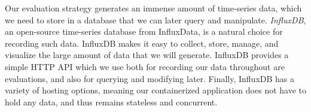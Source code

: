 Our evaluation strategy generates an immense amount of time-series data, which
we need to store in a database that we can later query and manipulate.
\textit{InfluxDB}, an open-source time-series database from InfluxData, is a
natural choice for recording such data. InfluxDB makes it easy to collect,
store, manage, and visualize the large amount of data that we will generate.
InfluxDB provides a simple HTTP API which we use both for recording our data
throughout are evaluations, and also for querying and modifying later.
Finally, InfluxDB has a variety of hosting options, meaning our containerized application
does not have to hold any data, and thus remains stateless and concurrent.
